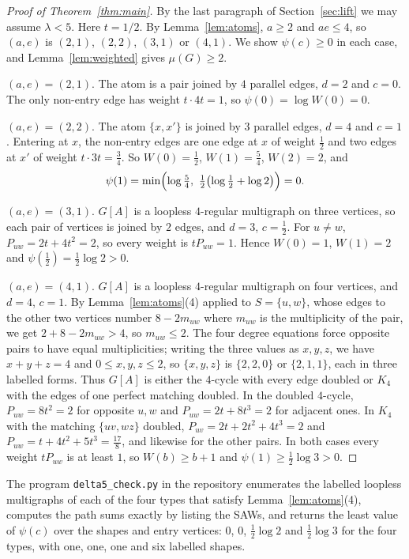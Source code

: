 \documentclass[11pt]{amsart}
\theoremstyle{remark}
\begin{document}
\begin{proof}[Proof of Theorem~\ref{thm:main}]
By the last paragraph of Section~\ref{sec:lift} we may assume $\lambda<5$. Here $t=1/2$. By Lemma~\ref{lem:atoms},
$a\ge2$ and $ae\le4$, so $(a,e)$ is $(2,1)$, $(2,2)$, $(3,1)$ or $(4,1)$. We show $\psi(c)\ge0$ in each case, and
Lemma~\ref{lem:weighted} gives $\mu(G)\ge2$.

$(a,e)=(2,1)$. The atom is a pair joined by $4$ parallel edges, $d=2$ and $c=0$. The only non-entry edge has weight
$t\cdot4t=1$, so $\psi(0)=\log W(0)=0$.

$(a,e)=(2,2)$. The atom $\{x,x'\}$ is joined by $3$ parallel edges, $d=4$ and $c=1$. Entering at $x$, the non-entry
edges are one edge at $x$ of weight $\tfrac12$ and two edges at $x'$ of weight $t\cdot3t=\tfrac34$. So
$W(0)=\tfrac12$, $W(1)=\tfrac54$, $W(2)=2$, and
\[
\psi(1)=\min\Bigl(\log\tfrac54,\ \tfrac12\bigl(\log\tfrac12+\log2\bigr)\Bigr)=0.
\]

$(a,e)=(3,1)$. $G[A]$ is a loopless $4$-regular multigraph on three vertices, so each pair of vertices is joined by
$2$ edges, and $d=3$, $c=\tfrac12$. For $u\ne w$, $P_{uw}=2t+4t^2=2$, so every weight is $tP_{uw}=1$. Hence
$W(0)=1$, $W(1)=2$ and $\psi(\tfrac12)=\tfrac12\log2>0$.

$(a,e)=(4,1)$. $G[A]$ is a loopless $4$-regular multigraph on four vertices, and $d=4$, $c=1$. By
Lemma~\ref{lem:atoms}(4) applied to $S=\{u,w\}$, whose edges to the other two vertices number $8-2m_{uw}$ where
$m_{uw}$ is the multiplicity of the pair, we get $2+8-2m_{uw}>4$, so $m_{uw}\le2$. The four degree equations force opposite pairs to have equal
multiplicities; writing the three values as $x,y,z$, we have $x+y+z=4$ and $0\le x,y,z\le2$, so $\{x,y,z\}$ is
$\{2,2,0\}$ or $\{2,1,1\}$, each in three labelled forms. Thus $G[A]$ is either the $4$-cycle with every edge doubled or
$K_4$ with the edges of one perfect matching doubled. In the doubled $4$-cycle, $P_{uw}=8t^2=2$ for opposite $u,w$ and
$P_{uw}=2t+8t^3=2$ for adjacent ones. In $K_4$ with the matching $\{uv,wz\}$ doubled,
$P_{uv}=2t+2t^2+4t^3=2$ and $P_{uw}=t+4t^2+5t^3=\tfrac{17}8$, and likewise for the other pairs. In both cases
every weight $tP_{uw}$ is at least $1$, so $W(b)\ge b+1$ and $\psi(1)\ge\tfrac12\log3>0$.
\end{proof}

The program \texttt{delta5\_check.py} in the repository \cite{Repo} enumerates the labelled loopless multigraphs of
each of the four types that satisfy Lemma~\ref{lem:atoms}(4), computes the path sums exactly by listing the SAWs, and
returns the least value of $\psi(c)$ over the shapes and entry vertices: $0$, $0$, $\tfrac12\log2$ and
$\tfrac12\log3$ for the four types, with one, one, one and six labelled shapes.
\end{document}

